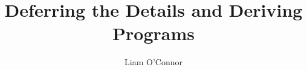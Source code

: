 \documentclass[sigplan]{acmart}%
\begin{document}
\title{Deferring the Details and Deriving Programs} %



\author{Liam O'Connor}

%
\end{document}
